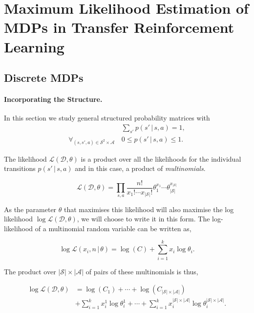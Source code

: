 \section{Maximum Likelihood Estimation of MDPs in Transfer Reinforcement Learning}\label{sec:MLE}

\subsection{Discrete MDPs}
\paragraph{Incorporating the Structure.}
In this section we study general structured probability matrices with \begin{align}
    &\sum_{s'} p(s' \, | \, s, a) = 1,\\
    \forall_{(s, s', a) \in \mathcal{S}^2\times\mathcal{A}} \, &0 \leq p(s' \, | \, s, a) \leq 1.
\end{align}

The likelihood $\mathcal{L}(\mathcal{D}, \theta)$ is a product over all the likelihoods for the individual transitions $p(s' \, | \, s, a)$ and in this case, a product of \emph{multinomials}.

\begin{equation}
    \mathcal{L}(\mathcal{D}, \theta) = \prod_{s, a} \frac{n!}{x_1! \cdots x_{|\mathcal{S}|}!}\theta_1^{x_1} \cdots \theta_{|\mathcal{S}|}^{x_{|\mathcal{S}|}} 
\end{equation}

As the parameter $\theta$ that maximises this likelihood will also maximise the log likelihood $\log \mathcal{L}(\mathcal{D}, \theta)$, we will choose to write it in this form. The log-likelihood of a multinomial random variable can be written as,

\begin{equation}
    \log \mathcal{L}(x_i, n \, | \, \theta) = \log(C) + \sum_{i=1}^k x_i \log \theta_i.
\end{equation}

The product over $|\mathcal{S}|\times|\mathcal{A}|$ of pairs of these multinomials is thus,

\begin{align}
    \log \mathcal{L}(\mathcal{D}, \theta) &= \log(C_1) + \cdots + \log ({C_{|\mathcal{S}|\times|\mathcal{A}|}})\\ &+ \sum_{i=1}^k x_i^1 \log \theta_i^1 + \cdots + \sum_{i=1}^k x_i^{|\mathcal{S}|\times|\mathcal{A}|} \log \theta_i^{|\mathcal{S}|\times|\mathcal{A}|}.
\end{align}

